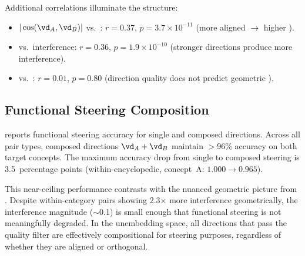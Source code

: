 Additional correlations illuminate the structure:
\begin{itemize}[leftmargin=*,itemsep=0pt,topsep=0pt]
    \item $|\cos(\vd_A, \vd_B)|$ vs.\ \cfs: $r = 0.37$, $p = 3.7 \times 10^{-11}$ (more aligned $\to$ higher \cfs).
    \item \loo vs.\ interference: $r = 0.36$, $p = 1.9 \times 10^{-10}$ (stronger directions produce more interference).
    \item \loo vs.\ \cfs: $r = 0.01$, $p = 0.80$ (direction quality does not predict geometric \cfs).
\end{itemize}


\subsection{Functional Steering Composition}
\label{sec:steering}

 reports functional steering accuracy for single and composed directions.
Across all pair types, composed directions $\vd_A + \vd_B$ maintain $>$96\% accuracy on both target concepts.
The maximum accuracy drop from single to composed steering is 3.5~percentage points (within-encyclopedic, concept~A: $1.000 \to 0.965$).

\begin{table}[t]
    \centering
    \caption{Functional steering accuracy. Single-direction accuracy and composed-direction accuracy ($\vd_A + \vd_B$) for both concepts are shown. Composition success is the minimum of composed accuracies.
    Steering composition is robust across all pair types, with $>$96\% accuracy everywhere.}
    \label{tab:steering}
\end{table}

This near-ceiling performance contrasts with the nuanced geometric picture from .
Despite within-category pairs showing 2.3$\times$ more interference geometrically, the interference magnitude ($\sim$0.1) is small enough that functional steering is not meaningfully degraded.
In the unembedding space, all directions that pass the \loo quality filter are effectively compositional for steering purposes, regardless of whether they are aligned or orthogonal.
